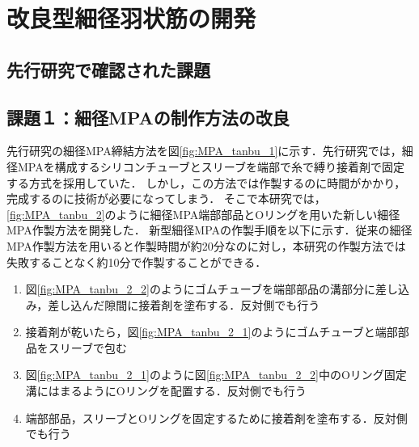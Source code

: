 \newpage
\section{改良型細径羽状筋の開発}
\subsection{先行研究で確認された課題}
\subsection{課題１：細径MPAの制作方法の改良}
先行研究の細径MPA締結方法を図\ref{fig:MPA_tanbu_1}に示す．先行研究では，細径MPAを構成するシリコンチューブとスリーブを端部で糸で縛り接着剤で固定する方式を採用していた．
しかし，この方法では作製するのに時間がかかり，完成するのに技術が必要になってしまう．
そこで本研究では，\ref{fig:MPA_tanbu_2}のように細径MPA端部部品とOリングを用いた新しい細径MPA作製方法を開発した．
新型細径MPAの作製手順を以下に示す．従来の細径MPA作製方法を用いると作製時間が約20分なのに対し，本研究の作製方法では失敗することなく約10分で作製することができる．
\vspace{3mm}
\begin{enumerate}
  \item 図\ref{fig:MPA_tanbu_2_2}のようにゴムチューブを端部部品の溝部分に差し込み，差し込んだ隙間に接着剤を塗布する．反対側でも行う
  \item 接着剤が乾いたら，図\ref{fig:MPA_tanbu_2_1}のようにゴムチューブと端部部品をスリーブで包む
  \item 図\ref{fig:MPA_tanbu_2_1}のように図\ref{fig:MPA_tanbu_2_2}中のOリング固定溝にはまるようにOリングを配置する．反対側でも行う
  \item 端部部品，スリーブとOリングを固定するために接着剤を塗布する．反対側でも行う
\end{enumerate}
